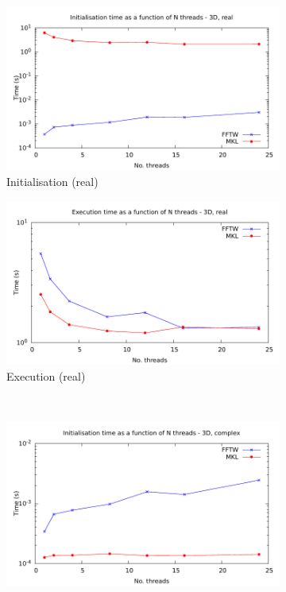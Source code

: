 \documentclass[12pt, a4paper]{article} \setlength{\textheight}{24cm}
\begin{document}
\begin{figure}[H]
  \centering
  \begin{subfigure}{.5\textwidth}
    \centering
    \includegraphics[width=.9\linewidth]{graphs/3d-multh-init-r.pdf}
    \caption{Initialisation (real)}
    \label{3DMULTHRI}
  \end{subfigure}%
  \begin{subfigure}{.5\textwidth}
    \centering
    \includegraphics[width=.9\linewidth]{graphs/3d-multh-exec-r.pdf}
    \caption{Execution (real)}
    \label{3DMULTHRE}
  \end{subfigure}\\
  \begin{subfigure}{.5\textwidth}
    \centering
    \includegraphics[width=.9\linewidth]{graphs/3d-multh-init-c.pdf}

\end{subfigure}
\end{figure}
\end{document}
